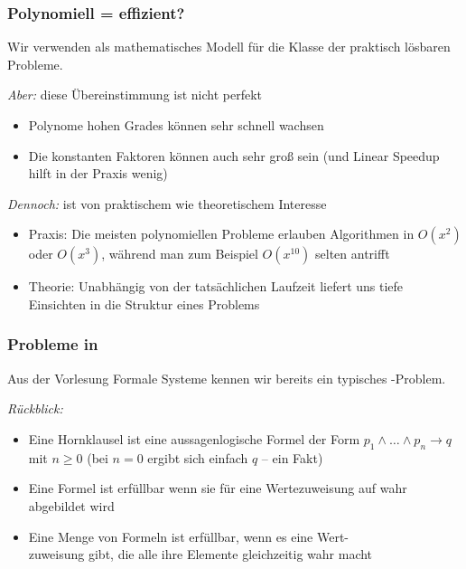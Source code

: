 \documentclass[aspectratio=1610,onlymath]{beamer}
\begin{document}
\begin{frame}\frametitle{Polynomiell = effizient?}

Wir verwenden  als mathematisches Modell für die Klasse
der praktisch lösbaren Probleme.
\bigskip

\emph{Aber:} diese Übereinstimmung ist nicht perfekt
\begin{itemize}
\item Polynome hohen Grades können sehr schnell wachsen
\item Die konstanten Faktoren können auch sehr groß sein (und Linear Speedup hilft in der Praxis wenig)
\end{itemize}\bigskip\pause

\emph{Dennoch:}  ist von praktischem wie theoretischem Interesse
\begin{itemize}
\item \alert{Praxis:} Die meisten polynomiellen Probleme erlauben Algorithmen in $O(x^2)$ oder $O(x^3)$, während man zum Beispiel $O(x^{10})$ selten antrifft
\item \alert{Theorie:} Unabhängig von der tatsächlichen Laufzeit liefert uns  tiefe Einsichten in die Struktur eines Problems
\end{itemize}

\end{frame}

\begin{frame}\frametitle{Probleme in }

Aus der Vorlesung Formale Systeme kennen wir bereits ein
typisches -Problem.\bigskip

\emph{Rückblick:}
\begin{itemize}
\item Eine \alert{Hornklausel} ist eine aussagenlogische Formel der Form $p_1\wedge\ldots\wedge p_n\to q$ mit $n\geq 0$
{\tiny (bei $n=0$ ergibt sich einfach $q$ -- ein \alert{Fakt})}
\item Eine Formel ist \alert{erfüllbar} wenn sie für eine Wertezuweisung auf wahr abgebildet wird
\item Eine Menge von Formeln ist erfüllbar, wenn es eine Wert-\\zuweisung gibt, die alle
ihre Elemente gleichzeitig wahr macht
\end{itemize}\bigskip


\end{frame}
\end{document}
